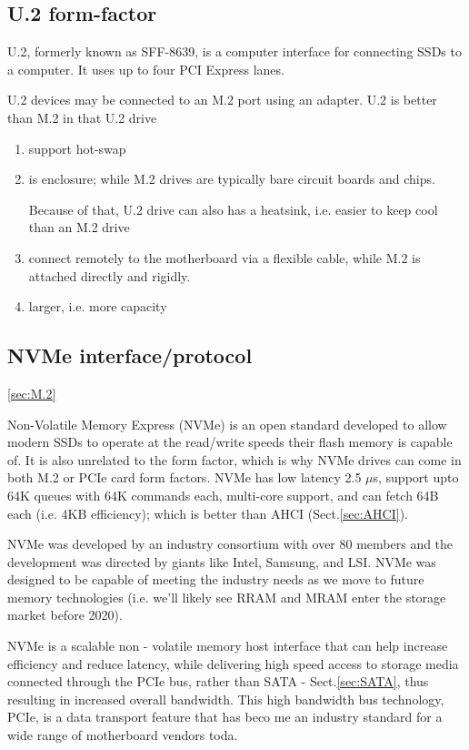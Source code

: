 \subsection{U.2 form-factor}

U.2, formerly known as SFF-8639, is a computer interface for connecting SSDs to
a computer. It uses up to four PCI Express lanes.

U.2 devices may be connected to an M.2 port using an adapter.
U.2 is better than M.2 in that U.2 drive 
\begin{enumerate}
  \item support hot-swap
  
  \item is enclosure; while M.2 drives are typically bare circuit
  boards and chips. 
  
  Because of that, U.2 drive can also has a heatsink, i.e. easier to keep cool
  than an M.2 drive 
  
  \item connect remotely to the motherboard via a flexible cable, while M.2 is
  attached directly and rigidly.
  
  \item larger, i.e. more capacity 
\end{enumerate}

\subsection{NVMe interface/protocol}
\label{sec:NVMe}
\ref{sec:M.2}

Non-Volatile Memory Express (NVMe) is an open standard developed to allow modern
SSDs to operate at the read/write speeds their flash memory is capable of.
It is also unrelated to the form factor, which is why NVMe drives can come in
both M.2 or PCIe card form factors. NVMe has low latency 2.5 $\mu$s, support
upto 64K queues with 64K commands each, multi-core support, and can fetch 64B
each (i.e. 4KB efficiency); which is better than AHCI (Sect.\ref{sec:AHCI}).

\begin{mdframed}
NVMe was developed by an industry consortium with over 80 members and the
development was directed by giants like Intel, Samsung, and LSI.
NVMe was designed to be capable of meeting the industry needs as we move to
future memory technologies (i.e. we'll likely see RRAM and MRAM enter the
storage market before 2020). 

NVMe is a scalable non - volatile memory host interface that can help increase
efficiency and reduce latency, while delivering high speed access to storage
media connected through the PCIe bus, rather than SATA - Sect.\ref{sec:SATA},
thus resulting in increased overall bandwidth. This high bandwidth bus
technology, PCIe, is a data transport feature that has beco me an industry
standard for a wide range of motherboard vendors toda.
\end{mdframed}


